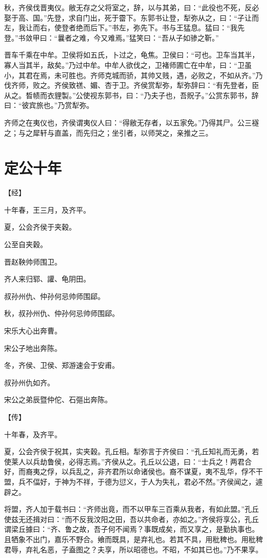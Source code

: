 \documentclass[a4paper,12pt,UTF8,twoside]{ctexbook}
\begin{document}
秋，齐侯伐晋夷仪。敝无存之父将室之，辞，以与其弟，曰：“此役也不死，反必娶于高、国。”先登，求自门出，死于霤下。东郭书让登，犁弥从之，曰：“子让而左，我让而右，使登者绝而后下。”书左，弥先下。书与王猛息。猛曰：“我先登。”书敛甲曰：“曩者之难，今又难焉。”猛笑曰：“吾从子如骖之靳。”

晋车千乘在中牟。卫侯将如五氏，卜过之，龟焦。卫侯曰：“可也。卫车当其半，寡人当其半，敌矣。”乃过中牟。中牟人欲伐之，卫褚师圃亡在中牟，曰：“卫虽小，其君在焉，未可胜也。齐师克城而骄，其帅又贱，遇，必败之，不如从齐。”乃伐齐师，败之。齐侯致禚、媚、杏于卫。齐侯赏犁弥，犁弥辞曰：“有先登者，臣从之。晳帻而衣貍製。”公使视东郭书，曰：“乃夫子也，吾貺子。”公赏东郭书，辞曰：“彼宾旅也。”乃赏犁弥。

齐师之在夷仪也，齐侯谓夷仪人曰：“得敝无存者，以五家免。”乃得其尸。公三襚之；与之犀轩与直盖，而先归之；坐引者，以师哭之，亲推之三。


\chapter{定公十年}



【经】

十年春，王三月，及齐平。

夏，公会齐侯于夹穀。

公至自夹穀。

晋赵鞅帅师围卫。

齐人来归郓、讙、龟阴田。

叔孙州仇、仲孙何忌帅师围郈。

秋，叔孙州仇、仲孙何忌帅师围郈。

宋乐大心出奔曹。

宋公子地出奔陈。

冬，齐侯、卫侯、郑游速会于安甫。

叔孙州仇如齐。

宋公之弟辰暨仲佗、石彄出奔陈。

【传】

十年春，及齐平。

夏，公会齐侯于祝其，实夹穀。孔丘相。犁弥言于齐侯曰：“孔丘知礼而无勇，若使莱人以兵劫鲁侯，必得志焉。”齐侯从之。孔丘以公退，曰：“士兵之！两君合好，而裔夷之俘，以兵乱之，非齐君所以命诸侯也。裔不谋夏，夷不乱华，俘不干盟，兵不偪好，于神为不祥，于德为愆义，于人为失礼，君必不然。”齐侯闻之，遽辟之。

将盟，齐人加于载书曰：“齐师出竟，而不以甲车三百乘从我者，有如此盟。”孔丘使兹无还揖对曰：“而不反我汶阳之田，吾以共命者，亦如之。”齐侯将享公，孔丘谓梁丘據曰：“齐、鲁之故，吾子何不闻焉？事既成矣，而又享之，是勤执事也。且牺象不出门，嘉乐不野合。飨而既具，是弃礼也。若其不具，用秕稗也。用秕稗君辱，弃礼名恶，子盍图之？夫享，所以昭德也。不昭，不如其已也。”乃不果享。
\end{document}
